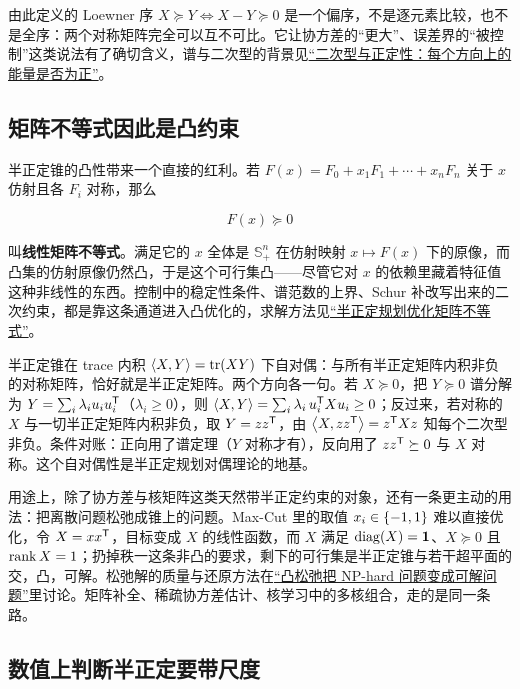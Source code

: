 由此定义的 Loewner 序 \(X\succeq Y\iff X-Y\succeq0\) 是一个偏序，不是逐元素比较，也不是全序：两个对称矩阵完全可以互不可比。它让协方差的``更大''、误差界的``被控制''这类说法有了确切含义，谱与二次型的背景见\hyperref[sec:03-Linear-Algebra/06-Symmetric-and-Positive-Definite-Matrices/02]{``二次型与正定性：每个方向上的能量是否为正''}。

\subsection{矩阵不等式因此是凸约束}

半正定锥的凸性带来一个直接的红利。若 \(F(x)=F_0+x_1F_1+\cdots+x_nF_n\) 关于 \(x\) 仿射且各 \(F_i\) 对称，那么

\[
F(x)\succeq0
\]

叫\textbf{线性矩阵不等式}。满足它的 \(x\) 全体是 \(\mathbb{S}_+^n\) 在仿射映射 \(x\mapsto F(x)\) 下的原像，而凸集的仿射原像仍然凸，于是这个可行集凸——尽管它对 \(x\) 的依赖里藏着特征值这种非线性的东西。控制中的稳定性条件、谱范数的上界、Schur 补改写出来的二次约束，都是靠这条通道进入凸优化的，求解方法见\hyperref[sec:09-Convex-Optimization/04-Convex-Problems/04]{``半正定规划优化矩阵不等式''}。

半正定锥在 trace 内积 \(\left\langle X,Y\right\rangle=\operatorname{tr}(XY)\) 下自对偶：与所有半正定矩阵内积非负的对称矩阵，恰好就是半正定矩阵。两个方向各一句。若 \(X\succeq0\)，把 \(Y\succeq0\) 谱分解为 \(Y=\sum_i\lambda_iu_iu_i^{\mathsf{T}}\)（\(\lambda_i\ge0\)），则 \(\left\langle X,Y\right\rangle=\sum_i\lambda_i\,u_i^{\mathsf{T}}Xu_i\ge0\)；反过来，若对称的 \(X\) 与一切半正定矩阵内积非负，取 \(Y=zz^{\mathsf{T}}\)，由 \(\left\langle X,zz^{\mathsf{T}}\right\rangle=z^{\mathsf{T}}Xz\) 知每个二次型非负。条件对账：正向用了谱定理（\(Y\) 对称才有），反向用了 \(zz^{\mathsf{T}}\succeq0\) 与 \(X\) 对称。这个自对偶性是半正定规划对偶理论的地基。

用途上，除了协方差与核矩阵这类天然带半正定约束的对象，还有一条更主动的用法：把离散问题松弛成锥上的问题。Max-Cut 里的取值 \(x_i\in\left\{-1,1\right\}\) 难以直接优化，令 \(X=xx^{\mathsf{T}}\)，目标变成 \(X\) 的线性函数，而 \(X\) 满足 \(\operatorname{diag}(X)=\mathbf{1}\)、\(X\succeq0\) 且 \(\operatorname{rank} X=1\)；扔掉秩一这条非凸的要求，剩下的可行集是半正定锥与若干超平面的交，凸，可解。松弛解的质量与还原方法在\hyperref[sec:09-Convex-Optimization/09-Complexity-and-Approximation/02]{``凸松弛把 NP-hard 问题变成可解问题''}里讨论。矩阵补全、稀疏协方差估计、核学习中的多核组合，走的是同一条路。

\subsection{数值上判断半正定要带尺度}

